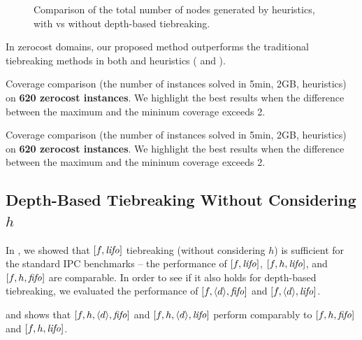 \begin{figure}[htb]
 \centering
 \caption{Comparison of the total number of nodes generated by \mands
 heuristics, with vs without depth-based tiebreaking.}
 \label{tbl:mands-evaluations}
\end{figure}

In zerocost domains, our proposed method outperforms the traditional
tiebreaking methods in both \lmcut and \mands heuristics
( and ).

\begin{table}[htbp]
 {
 \centering
 
 \caption{
 Coverage comparison (the number of instances solved in 5min, 2GB, \lmcut heuristics) 
 on \textbf{620 zerocost instances}. We highlight the
 best results when the difference between the maximum and the mininum coverage exceeds 2.
 }
 \label{lmcut-zerocost-full}
 }
\end{table}

\begin{table}[htbp]
 {
 \centering
 
 \caption{
 Coverage comparison (the number of instances solved in 5min, 2GB, \mands heuristics)
 on \textbf{620 zerocost instances}. We highlight the
 best results when the difference between the maximum and the mininum coverage exceeds 2.
 }
 \label{mands-zerocost-full}
 }
\end{table}



\subsection{Depth-Based Tiebreaking Without Considering $h$}

In , we showed that $[f,{\mbox{\textit{lifo}}}]$ tiebreaking
(without considering $h$) is sufficient for the standard IPC benchmarks
-- the performance of $[f,{\mbox{\textit{lifo}}}]$, $[f,h,{\mbox{\textit{lifo}}}]$, and $[f,h,{\mbox{\textit{fifo}}}]$ are
comparable.  In order to see if it also holds for depth-based
tiebreaking, we evaluated the performance of $[f,{\left<d\right>},{\mbox{\textit{fifo}}}]$
and $[f,{\left<d\right>},{\mbox{\textit{lifo}}}]$.

 and 
 shows that
 $[f,h,{\left<d\right>},{\mbox{\textit{fifo}}}]$ and  $[f,h,{\left<d\right>},{\mbox{\textit{lifo}}}]$
 perform comparably to $[f,h,{\mbox{\textit{fifo}}}]$ and $[f,h,{\mbox{\textit{lifo}}}]$.


